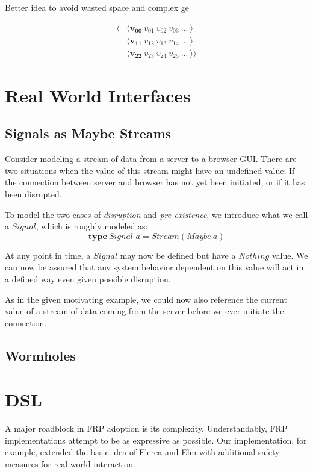\documentclass[twocolumn,11pt,english]{article}
\begin{document}
Better idea to avoid wasted space and complex ge


\begin{align*}
  \langle &\langle \mathbf{v_{00}} ~ v_{01} ~ v_{02} ~ v_{03} ~ ... ~ \rangle \\
  &\langle  \mathbf{v_{11}} ~ v_{12} ~ v_{13} ~ v_{14} ~ ... ~ \rangle \\
  &\langle  \mathbf{v_{22}} ~ v_{23} ~ v_{24} ~ v_{25} ~ ...  ~ \rangle \rangle
\end{align*}


\section{Real World Interfaces}
\subsection{Signals as Maybe Streams}
  Consider modeling a stream of data from a server to a browser GUI. There are two situations when the value of this stream might have an undefined value: If the connection between server and browser has not yet been initiated, or if it has been disrupted. 

To model the two cases of \textit{disruption} and \textit{pre-existence}, we introduce what we call a $Signal$, which is roughly modeled as:
\begin{equation}
  \textbf{type}~\textit{Signal a} = Stream (Maybe~a)
\end{equation}

At any point in time, a $Signal$ may now be defined but have a $Nothing$ value. We can now be assured that any system behavior dependent on this value will act in a defined way even given possible disruption. 

As in the given motivating example, we could now also reference the current value of a stream of data coming from the server before we ever initiate the connection.

\subsection{Wormholes}
\cite{WinogradCort2012HS}

\section{DSL}

A major roadblock in FRP adoption is its complexity. Understandably, FRP implementations attempt to be as expressive as possible. Our implementation, for example, extended the basic idea of Elerea and Elm with additional safety measures for real world interaction. 
\end{document}
